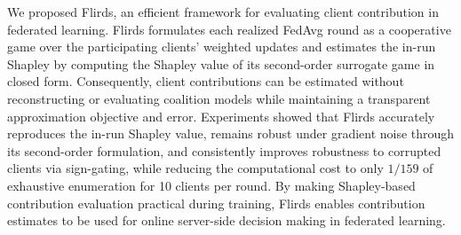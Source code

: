 \documentclass[letterpaper]{article} %
\theoremstyle{definition} %
\begin{document}
We proposed Flirds, an efficient framework for evaluating client contribution in federated learning. Flirds formulates each realized FedAvg round as a cooperative game over the participating clients' weighted updates and estimates the in-run Shapley by computing the Shapley value of its second-order surrogate game in closed form. Consequently,
client contributions can be estimated without reconstructing or evaluating
coalition models while maintaining a transparent approximation objective and
error. Experiments showed that Flirds accurately reproduces the in-run Shapley value,
remains robust under gradient noise through its second-order formulation, and
consistently improves robustness to corrupted clients via sign-gating, while
reducing the computational cost to only $1/159$ of exhaustive enumeration for
10 clients per round. By making Shapley-based contribution evaluation practical
during training, Flirds enables contribution estimates to be used for
online server-side decision making in federated learning.






% 
\end{document}
